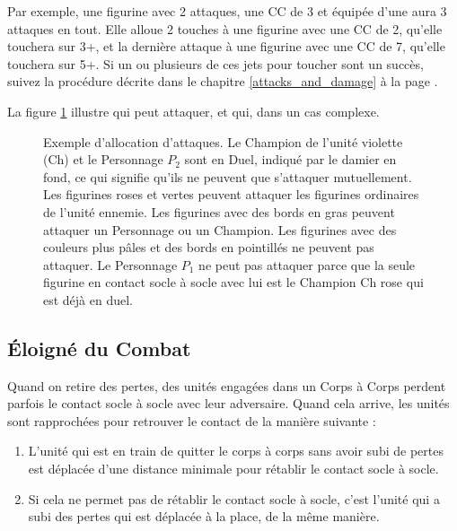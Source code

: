 Par exemple, une figurine avec 2 attaques, une CC de 3 et équipée d'une \pw{} aura 3 attaques en tout. Elle alloue 2 touches à une figurine avec une CC de 2, qu'elle touchera sur 3+, et la dernière attaque à une figurine avec une CC de 7, qu'elle touchera sur 5+. Si un ou plusieurs de ces jets pour toucher sont un succès, suivez la procédure décrite dans le chapitre \ref{attacks_and_damage} à la page \pageref{attacks_and_damage}.

La figure \ref{figure/allocation} illustre qui peut attaquer, et qui, dans un cas complexe.
\clearpage

\newcommand{\figAHCharOne}{$P_{1} $}
\newcommand{\figAHCharTwo}{$P_{2} $}
\newcommand{\figAHCharThree}{$P_{3} $}
\newcommand{\figAHChamp}{Ch}
\newcommand{\figAHMus}{Mu}
\newcommand{\figAHStand}{Ét}

\begin{figure}[!htbp]
\begin{minipage}{0.48\textwidth}
\def\svgwidth{\textwidth}

\end{minipage}\hfill\begin{minipage}{0.51\textwidth}
\caption{Exemple d'allocation d'attaques.\vspace*{10pt}\newline
Le Champion de l'unité violette (Ch) et le Personnage $ P_{2} $ sont en Duel, indiqué par le damier en fond, ce qui signifie qu'ils ne peuvent que s'attaquer mutuellement. Les figurines roses et vertes peuvent attaquer les figurines ordinaires de l'unité ennemie. Les figurines avec des bords en gras peuvent attaquer un Personnage ou un Champion. Les figurines avec des couleurs plus pâles et des bords en pointillés ne peuvent pas attaquer. Le Personnage $ P_{1} $ ne peut pas attaquer parce que la seule figurine en contact socle à socle avec lui est le Champion Ch rose qui est déjà en duel.}
\label{figure/allocation}
\end{minipage}
\end{figure}

\subsection{Éloigné du Combat}
\label{dropping_out_of_combat}

Quand on retire des pertes, des unités engagées dans un Corps à Corps perdent parfois le contact socle à socle avec leur adversaire. Quand cela arrive, les unités sont rapprochées pour retrouver le contact de la manière suivante :
\begin{enumerate}
\item L'unité qui est en train de quitter le corps à corps sans avoir subi de pertes est déplacée d'une distance minimale pour rétablir le contact socle à socle.
\item Si cela ne permet pas de rétablir le contact socle à socle, c'est l'unité qui a subi des pertes qui est déplacée à la place, de la même manière.
\end{enumerate}

